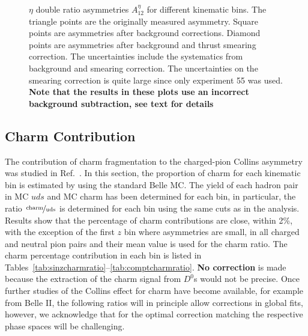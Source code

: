 \begin{figure}[h]
  \caption[$\eta$ double ratio asymmetries $A^{\eta}_{12}$ after background and thrust-smearing corrections for different kinematic bins]{$\eta$ double ratio asymmetries $A^{\eta}_{12}$ for different kinematic bins. The triangle points are the originally measured asymmetry. Square points are asymmetries after background corrections. Diamond points are asymmetries after background and thrust smearing correction. The uncertainties include the systematics from background and smearing correction.  The uncertainties on the smearing correction is quite large since only experiment 55 was used. {\bf Note that the results in these plots use an incorrect background subtraction, see text for details}}
  \label{fig:etaresult}
\end{figure}


\subsection{Charm Contribution}
\label{sec:charmcontribution}
The contribution of charm fragmentation to the charged-pion Collins asymmetry was studied in Ref.~\cite{ChargedPionResult2}. 
In this section, the proportion of charm for each kinematic bin is estimated by using the standard Belle MC. The yield of each hadron pair in MC \(uds\) and MC charm has been determined for each bin, in particular, the ratio $\nicefrac{\mathrm{charm}}{\mathrm{uds}}$ is determined for each bin using the same cuts as in the analysis. Results show that the percentage of charm contributions are close, within 2\%, with the exception of the first $z$ bin where asymmetries are small, in all charged and neutral pion pairs and their mean value is used for the charm ratio. The charm percentage contribution in each bin is listed in Tables~\ref{tab:sinzcharmratio}--\ref{tab:comptcharmratio}. {\bf No correction} is made because the extraction of the charm signal from $D^0$s would not be precise. Once further studies of the Collins effect for charm have become available, for example from Belle II, the following ratios will in principle allow corrections in global fits, however, we acknowledge that for the optimal correction matching the respective phase spaces will be challenging.

